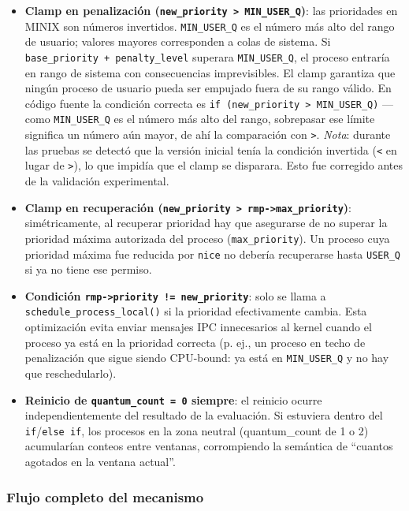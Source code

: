 \documentclass[11pt,a4paper]{article}
\begin{document}
\begin{itemize}[leftmargin=*]
  \item \textbf{Clamp en penalizaci\'on (\texttt{new\_priority > MIN\_USER\_Q})}: las prioridades en MINIX son n\'umeros invertidos. \texttt{MIN\_USER\_Q} es el n\'umero m\'as alto del rango de usuario; valores mayores corresponden a colas de sistema. Si \texttt{base\_priority + penalty\_level} superara \texttt{MIN\_USER\_Q}, el proceso entrar\'ia en rango de sistema con consecuencias imprevisibles. El clamp garantiza que ning\'un proceso de usuario pueda ser empujado fuera de su rango v\'alido. En c\'odigo fuente la condici\'on correcta es \texttt{if (new\_priority > MIN\_USER\_Q)} ---como \texttt{MIN\_USER\_Q} es el n\'umero m\'as alto del rango, sobrepasar ese l\'imite significa un n\'umero a\'un mayor, de ah\'i la comparaci\'on con \texttt{>}. \emph{Nota}: durante las pruebas se detect\'o que la versi\'on inicial ten\'ia la condici\'on invertida (\texttt{<} en lugar de \texttt{>}), lo que impid\'ia que el clamp se disparara. Esto fue corregido antes de la validaci\'on experimental.
  \item \textbf{Clamp en recuperaci\'on (\texttt{new\_priority > rmp->max\_priority})}: sim\'etricamente, al recuperar prioridad hay que asegurarse de no superar la prioridad m\'axima autorizada del proceso (\texttt{max\_priority}). Un proceso cuya prioridad m\'axima fue reducida por \texttt{nice} no deber\'ia recuperarse hasta \texttt{USER\_Q} si ya no tiene ese permiso.
  \item \textbf{Condici\'on \texttt{rmp->priority != new\_priority}}: solo se llama a \texttt{schedule\_process\_local()} si la prioridad efectivamente cambia. Esta optimizaci\'on evita enviar mensajes IPC innecesarios al kernel cuando el proceso ya est\'a en la prioridad correcta (p. ej., un proceso en techo de penalizaci\'on que sigue siendo CPU-bound: ya est\'a en \texttt{MIN\_USER\_Q} y no hay que reschedularlo).
  \item \textbf{Reinicio de \texttt{quantum\_count = 0} siempre}: el reinicio ocurre independientemente del resultado de la evaluaci\'on. Si estuviera dentro del \texttt{if}/\texttt{else if}, los procesos en la zona neutral (quantum\_count de 1 o 2) acumular\'ian conteos entre ventanas, corrompiendo la sem\'antica de ``cuantos agotados en la ventana actual''.
\end{itemize}

\subsubsection*{Flujo completo del mecanismo}
\end{document}
